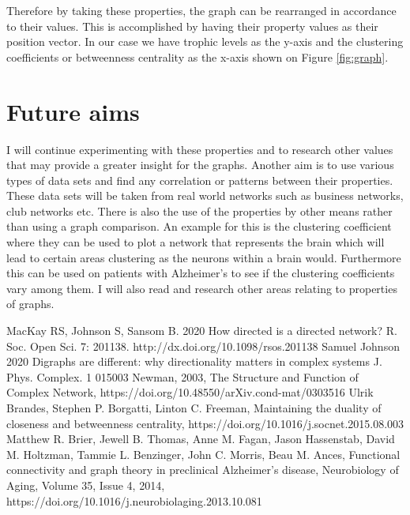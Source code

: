 \documentclass[12pt]{article}
\begin{document}
Therefore by taking these properties, the graph can be rearranged in accordance to their values. This is accomplished by having their property values as their position vector. In our case we have trophic levels as the y-axis and the clustering coefficients or betweenness centrality as the x-axis shown on Figure \ref{fig:graph}.
\section{Future aims}
I will continue experimenting with these properties and to research other values that may provide a greater insight for the graphs. Another aim is to use various types of data sets and find any correlation or patterns between their properties. These data sets will be taken from real world networks such as business networks, club networks etc. There is also the use of the properties by other means rather than using a graph comparison. An example for this is the clustering coefficient where they can be used to plot a network that represents the brain which will lead to certain areas clustering as the neurons\cite{5} within a brain would. Furthermore this can be used on patients with Alzheimer's to see if the clustering coefficients vary among them. I will also read and research other areas relating to properties of graphs.




\begin{thebibliography}{9}
MacKay RS, Johnson S, Sansom B. 2020 How directed is a directed network? R. Soc. Open Sci. 7: 201138. http://dx.doi.org/10.1098/rsos.201138
Samuel Johnson 2020 Digraphs are different: why directionality matters in complex systems J. Phys. Complex. 1 015003
Newman, 2003, The Structure and Function of Complex Network, https://doi.org/10.48550/arXiv.cond-mat/0303516
Ulrik Brandes, Stephen P. Borgatti, Linton C. Freeman, Maintaining the duality of closeness and betweenness centrality, https://doi.org/10.1016/j.socnet.2015.08.003
Matthew R. Brier, Jewell B. Thomas, Anne M. Fagan, Jason Hassenstab, David M. Holtzman, Tammie L. Benzinger, John C. Morris, Beau M. Ances, Functional connectivity and graph theory in preclinical Alzheimer's disease, Neurobiology of Aging, Volume 35, Issue 4, 2014, https://doi.org/10.1016/j.neurobiolaging.2013.10.081
\end{thebibliography}
\end{document}
